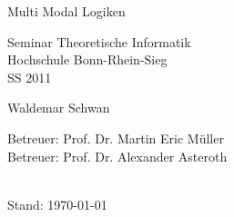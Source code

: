 
\begin{titlepage}
	
	\vspace*{0.8cm}
	
	\begin{center}
		\begin{Huge}
			Multi Modal Logiken
		\end{Huge}
	\end{center}
	
	\vspace*{2cm}
	
	\begin{center}
		\begin{Large}
			Seminar Theoretische Informatik\\
			Hochschule Bonn-Rhein-Sieg\\
			SS 2011
		\end{Large}			
	\end{center}

	\vspace*{3.5cm}
	
	\begin{center}
		\begin{Large}
			Waldemar Schwan 
		\end{Large}			
	\end{center}
	\vspace*{4.5cm}
	\begin{large}
		Betreuer: Prof. Dr. Martin Eric Müller \\
		Betreuer: Prof. Dr. Alexander Asteroth \\
	\end{large}
	\\
	Stand: \today
\end{titlepage}